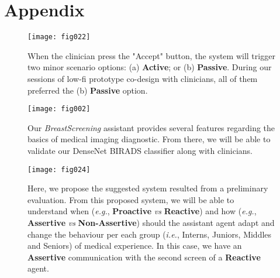 \appendix
\addappheadtotoc
{}
\section{Appendix}
\label{sec:sec010}

\begin{figure}[htbp]
\onecolumn
\centering
\texttt{[image: fig022]}
\caption{When the clinician press the "Accept" button, the system will trigger two minor scenario options: (a) {\bf Active}; or (b) {\bf Passive}. During our sessions of low-fi prototype co-design with clinicians, all of them preferred the (b) {\bf Passive} option.}
\label{fig:fig022}
\twocolumn
\end{figure}

\begin{figure}[htbp]
\onecolumn
\centering
\texttt{[image: fig002]}
\caption{Our {\it BreastScreening} assistant provides several features regarding the basics of medical imaging diagnostic. From there, we will be able to validate our DenseNet BIRADS classifier along with clinicians.}
\label{fig:fig002}
\twocolumn
\end{figure}

\clearpage

\begin{figure}[t!]
\onecolumn
\centering
\texttt{[image: fig024]}
\caption{Here, we propose the suggested system resulted from a preliminary evaluation. From this proposed system, we will be able to understand when ({\it e.g.}, {\bf Proactive} {\it vs} {\bf Reactive}) and how ({\it e.g.}, {\bf Assertive} {\it vs} {\bf Non-Assertive}) should the assistant agent adapt and change the behaviour per each group ({\it i.e.}, Interns, Juniors, Middles and Seniors) of medical experience. In this case, we have an {\bf Assertive} communication with the second screen of a {\bf Reactive} agent.}
\label{fig:fig024}
\twocolumn
\end{figure}
